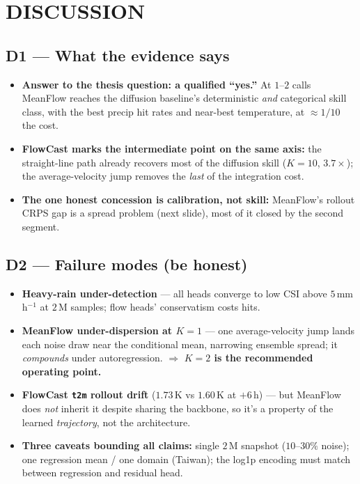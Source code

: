 \documentclass[11pt]{article}
\begin{document}
\section*{DISCUSSION}

\subsection*{D1 --- What the evidence says}
\begin{itemize}
  \item \textbf{Answer to the thesis question: a qualified ``yes.''} At
        $1$--$2$ calls MeanFlow reaches the diffusion baseline's deterministic
        \emph{and} categorical skill class, with the best precip hit rates and
        near-best temperature, at $\approx 1/10$ the cost.
  \item \textbf{FlowCast marks the intermediate point on the same axis:} the
        straight-line path already recovers most of the diffusion skill ($K{=}10$,
        $3.7\times$); the average-velocity jump removes the \emph{last} of the
        integration cost.
  \item \textbf{The one honest concession is calibration, not skill:}
        MeanFlow's rollout CRPS gap is a spread problem (next slide), most
        of it closed by the second segment.
\end{itemize}

\subsection*{D2 --- Failure modes (be honest)}
\begin{itemize}
  \item \textbf{Heavy-rain under-detection} --- all heads converge to low CSI
        above $5$\,mm\,h$^{-1}$ at $2$\,M samples; flow heads' conservatism
        costs hits.
  \item \textbf{MeanFlow under-dispersion at $K{=}1$} --- one average-velocity
        jump lands each noise draw near the conditional mean, narrowing
        ensemble spread; it \emph{compounds} under autoregression. $\Rightarrow$
        \textbf{$K{=}2$ is the recommended operating point.}
  \item \textbf{FlowCast \texttt{t2m} rollout drift} ($1.73$\,K vs $1.60$\,K at
        $+6$\,h) --- but MeanFlow does \emph{not} inherit it despite sharing the
        backbone, so it's a property of the learned \emph{trajectory}, not the
        architecture.
  \item \textbf{Three caveats bounding all claims:} single $2$\,M snapshot
        ($10$--$30\%$ noise); one regression mean / one domain (Taiwan); the
        log1p encoding must match between regression and residual head.
\end{itemize}
\end{document}
